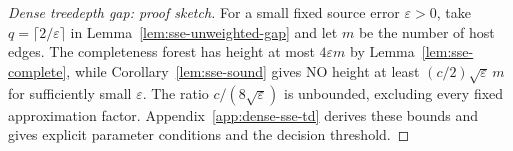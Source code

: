 \begin{proof}[Dense treedepth gap: proof sketch]
For a small fixed source error $\varepsilon>0$, take
$q=\lceil2/\varepsilon\rceil$ in Lemma~\ref{lem:sse-unweighted-gap}
and let $m$ be the number of host edges. The completeness forest
has height at most $4\varepsilon m$ by
Lemma~\ref{lem:sse-complete}, while
Corollary~\ref{lem:sse-sound} gives NO height at least
$(c/2)\sqrt\varepsilon\,m$ for sufficiently small $\varepsilon$.
The ratio $c/(8\sqrt\varepsilon)$ is unbounded, excluding every
fixed approximation factor. Appendix~\ref{app:dense-sse-td}
derives these bounds and gives explicit parameter conditions and
the decision threshold.
\end{proof}
